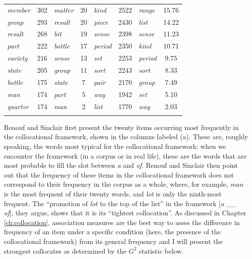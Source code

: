 \begin{table}[!htbp]
{\begin{tabular}[t]{lS|lS||lS|lS}
\textit{member} & 302 & \textit{matter} & 20 & \textit{kind} & 2522 & \textit{range} & 15.76 \\
\textit{group} & 293 & \textit{result} & 20 & \textit{piece} & 2430 & \textit{list} & 14.22 \\
\textit{result} & 268 & \textit{bit} & 19 & \textit{sense} & 2398 & \textit{sense} & 11.23 \\
\textit{part} & 222 & \textit{bottle} & 17 & \textit{period} & 2350 & \textit{kind} & 10.71 \\
\textit{variety} & 216 & \textit{sense} & 13 & \textit{set} & 2253 & \textit{period} & 9.75 \\
\textit{state} & 205 & \textit{group} & 11 & \textit{sort} & 2243 & \textit{sort} & 8.33 \\
\textit{bottle} & 175 & \textit{state} & 7 & \textit{pair} & 2170 & \textit{group} & 7.49 \\
\textit{man} & 174 & \textit{part} & 5 & \textit{way} & 1942 & \textit{set} & 5.10 \\
\textit{quarter} & 174 & \textit{man} & 2 & \textit{list} & 1770 & \textit{way} & 2.03 \\
\lspbottomrule
\end{tabular}}
\end{table}

Renouf and Sinclair first present the twenty items occurring most frequently in the collocational framework, shown in the columns labeled (a). These are, roughly speaking, the words most typical for the collocational framework: when we encounter the framework (in a corpus or in real life), these are the words that are most probable to fill the slot between \textit{a} and \textit{of}. Renouf and Sinclair then point out that the frequency of these items in the collocational framework does not correspond to their frequency in the corpus as a whole, where, for example, \textit{man} is the most frequent of their twenty words, and \textit{lot} is only the ninth-most frequent. The ``promotion of \textit{lot} to the top of the list'' in the framework [\textit{a} \_\_ \textit{of}], they argue, shows that it is its ``tightest collocation''. As discussed in Chapter \ref{ch:collocation}, association measures are the best way to asses the difference in frequency of an item under a specific condition (here, the presence of the collocational framework) from its general frequency and I will present the strongest collocates as determined by the $G^2$ statistic below.


